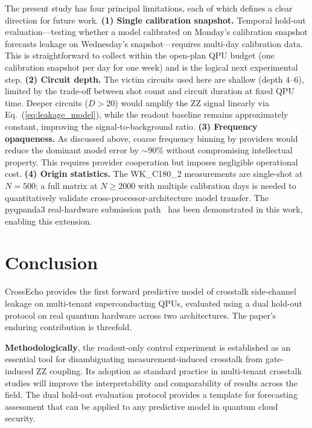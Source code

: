 \documentclass[ASNA,twocolumn]{USG}
\begin{document}
The present study has four principal limitations, each of which defines a clear direction for future work. \textbf{(1) Single calibration snapshot.} Temporal hold-out evaluation---testing whether a model calibrated on Monday's calibration snapshot forecasts leakage on Wednesday's snapshot---requires multi-day calibration data. This is straightforward to collect within the open-plan QPU budget (one calibration snapshot per day for one week) and is the logical next experimental step. \textbf{(2) Circuit depth.} The victim circuits used here are shallow (depth $4$--$6$), limited by the trade-off between shot count and circuit duration at fixed QPU time. Deeper circuits ($D > 20$) would amplify the ZZ signal linearly via Eq.~(\ref{eq:leakage_model}), while the readout baseline remains approximately constant, improving the signal-to-background ratio. \textbf{(3) Frequency opaqueness.} As discussed above, coarse frequency binning by providers would reduce the dominant model error by $\sim 90\%$ without compromising intellectual property. This requires provider cooperation but imposes negligible operational cost. \textbf{(4) Origin statistics.} The WK\_C180\_2 measurements are single-shot at $N = 500$; a full matrix at $N \geq 2000$ with multiple calibration days is needed to quantitatively validate cross-processor-architecture model transfer. The pyqpanda3 real-hardware submission path~\cite{pyqpanda3} has been demonstrated in this work, enabling this extension.

\section{Conclusion}
\label{sec:conclusion}

CrossEcho provides the first forward predictive model of crosstalk side-channel leakage on multi-tenant superconducting QPUs, evaluated using a dual hold-out protocol on real quantum hardware across two architectures. The paper's enduring contribution is threefold.

\textbf{Methodologically}, the readout-only control experiment is established as an essential tool for disambiguating measurement-induced crosstalk from gate-induced ZZ coupling. Its adoption as standard practice in multi-tenant crosstalk studies will improve the interpretability and comparability of results across the field. The dual hold-out evaluation protocol provides a template for forecasting assessment that can be applied to any predictive model in quantum cloud security.
\end{document}
